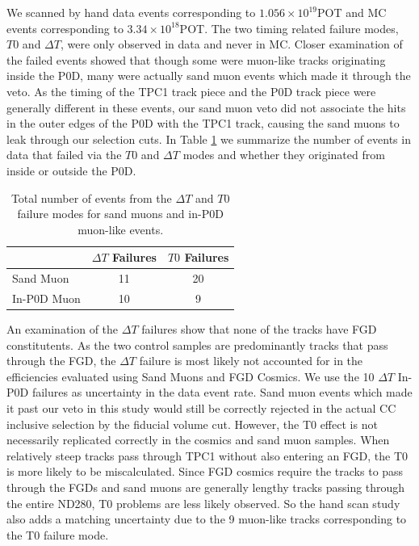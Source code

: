 We scanned by hand data events corresponding to $1.056\times 10^{19}$POT and MC events corresponding to $3.34\times 10^{18}$POT. The two timing related failure modes, $T0$ and $\Delta T$, were only observed in data and never in MC. Closer examination of the failed events showed that though some were muon-like tracks originating inside the P0D, many were actually sand muon events which made it through the veto. As the timing of the TPC1 track piece and the P0D track piece were generally different in these events, our sand muon veto did not associate the hits in the outer edges of the P0D with the TPC1 track, causing the sand muons to leak through our selection cuts. In Table \ref{tab:handscan} we summarize the number of events in data that failed via the $T0$ and $\Delta T$ modes and whether they originated from inside or outside the P0D.
\begin{table}[h]
\caption{
Total number of events from the $\Delta T$ and $T0$ failure modes for sand muons and in-P0D muon-like events.
}
\centering
\begin{tabular}{lcc}\toprule
& $\Delta T$ Failures & $T0$ Failures\\\midrule
Sand Muon & 11 & 20 \\
In-P0D Muon & 10 & 9 \\\bottomrule
\end{tabular}
\label{tab:handscan}
\end{table}

An examination of the $\Delta T$ failures show that none of the tracks have FGD constitutents. As the two control samples are predominantly tracks that pass through the FGD, the $\Delta T$ failure is most likely not accounted for in the efficiencies evaluated using Sand Muons and FGD Cosmics. We use the 10 $\Delta T$ In-P0D failures as uncertainty in the data event rate. 
Sand muon events which made it past our veto in this study would still be correctly rejected in the actual CC inclusive selection by the fiducial volume cut. However, the T0 effect is not necessarily replicated correctly in the cosmics and sand muon samples. When relatively steep tracks pass through TPC1 without also entering an FGD, the T0 is more likely to be miscalculated. Since FGD cosmics require the tracks to pass through the FGDs and sand muons are generally lengthy tracks passing through the entire ND280, T0 problems are less likely observed. So the hand scan study also adds a matching uncertainty due to the 9 muon-like tracks corresponding to the T0 failure mode. 

